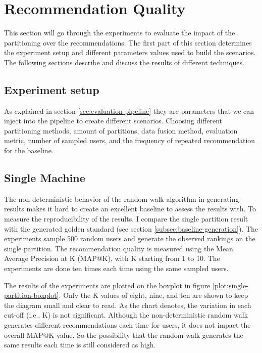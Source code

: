 \section{Recommendation Quality}
\label{sec:recommendation-quality}
This section will go through the experiments to evaluate the impact of the partitioning over the recommendations. The first part of this section determines the experiment setup and different parameters values used to build the scenarios. The following sections describe and discuss the results of different techniques.


\subsection{Experiment setup}
\label{subsec:experiment-setup}
As explained in section \ref{sec:evaluation-pipeline} they are parameters that we can inject into the pipeline to create different scenarios. Choosing different partitioning methods, amount of partitions, data fusion method, evaluation metric, number of sampled users, and the frequency of repeated recommendation for the baseline.


\subsection{Single Machine}
\label{subsec:eval-single-machine}
The non-deterministic behavior of the random walk algorithm in generating results makes it hard to create an excellent baseline to assess the results with. To measure the reproducibility of the results, I compare the single partition result with the generated golden standard (see section \ref{subsec:baseline-generation}). The experiments sample 500 random users and generate the observed rankings on the single partition. The recommendation quality is measured using the Mean Average Precision at K (MAP@K), with K starting from 1 to 10. The experiments are done ten times each time using the same sampled users. 

The results of the experiments are plotted on the boxplot in figure \ref{plot:single-partition-boxplot}. Only the K values of eight, nine, and ten are shown to keep the diagram small and clear to read. As the chart denotes, the variation in each cut-off (i.e., K) is not significant. Although the non-deterministic random walk generates different recommendations each time for users, it does not impact the overall MAP@K value. So the possibility that the random walk generates the same results each time is still considered as high.


